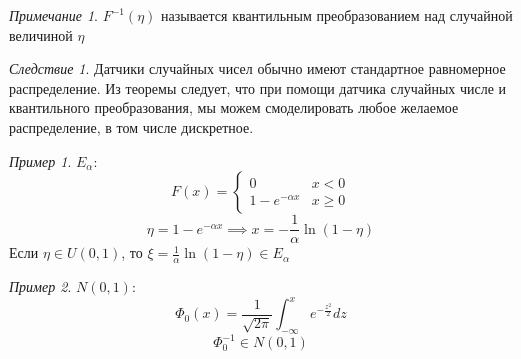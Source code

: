 \documentclass[oneside]{book}
\theoremstyle{plain}
\theoremstyle{remark}
\newtheorem*{remark}{Примечание}
\newtheorem{corollary}{Следствие}[theorem]
\newtheorem*{examp}{Пример}
\theoremstyle{definition}
\begin{document}
\begin{remark}
\(F^{-1}(\eta)\) называется квантильным преобразованием над случайной величиной \(\eta\)
\end{remark}
\begin{corollary}
Датчики случайных чисел обычно имеют стандартное равномерное распределение. Из теоремы следует, что при помощи датчика случайных числе и квантильного преобразования, мы можем смоделировать любое желаемое распределение, в том числе дискретное.
\end{corollary}
\begin{examp}
\(E_\alpha\):
\[ F(x) = \begin{cases}
0 & x < 0 \\
1 - e^{-\alpha x} & x \ge 0
\end{cases}\]
\[ \eta = 1 - e^{-\alpha x} \implies x = -\frac{1}{\alpha}\ln(1 - \eta) \]
Если \(\eta \in U(0, 1)\), то \(\xi = \frac{1}{\alpha} \ln(1 - \eta) \in E_\alpha\)
\end{examp}
\begin{examp}
\(N(0, 1)\):
\[ \Phi_0(x) = \frac{1}{\sqrt{2 \pi}} \int_{-\infty}^x  e^{-\frac{z^2}{2}} dz\]
\[ \Phi^{-1}_0 \in N(0, 1) \]
\end{examp}
\end{document}
